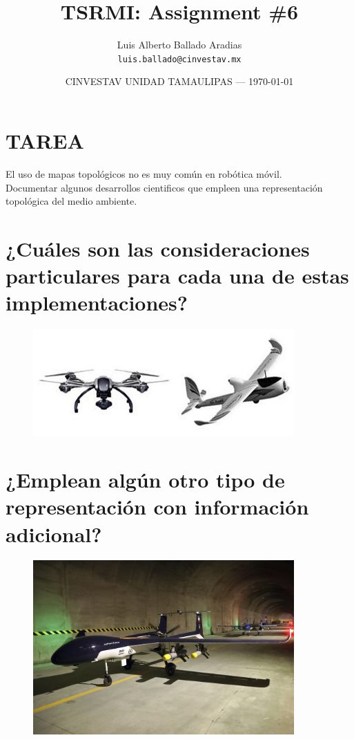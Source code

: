 \documentclass{article}
\title{TSRMI: Assignment \#6} %
\author{Luis Alberto Ballado Aradias\\ \texttt{luis.ballado@cinvestav.mx}} %
\date{CINVESTAV UNIDAD TAMAULIPAS --- \today} %
\begin{document}
\maketitle %


\section*{TAREA} %
El uso de mapas topológicos no es muy común en robótica móvil.\\
Documentar algunos desarrollos cientificos que empleen una representación topológica del medio ambiente.

\newpage
\section{¿Cuáles son las consideraciones particulares para cada una de estas implementaciones?} %


\begin{figure}[h]
\includegraphics[width=10cm]{images/vant.jpg}
\centering
\end{figure}

\newpage
\section{¿Emplean algún otro tipo de representación con información adicional?}

\begin{figure}[h]
\includegraphics[width=10cm]{images/drone_alafija.jpg}
\centering
\end{figure}

\end{document}
